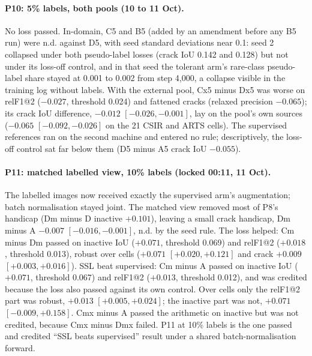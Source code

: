 \paragraph{P10: 5\% labels, both pools (10 to 11 Oct).} No loss passed. In-domain, C5 and B5 (added by an amendment before any B5
run) were n.d. against D5, with seed standard deviations near 0.1: seed 2 collapsed under both pseudo-label losses (crack IoU 0.142
and 0.128) but not under its loss-off control, and in that seed the tolerant arm's rare-class pseudo-label share stayed at 0.001 to 0.002 from step
4,000, a collapse visible in the training log without labels. With the external pool, Cx5 minus Dx5 was worse on relF1@2
($-0.027$, threshold 0.024) and fattened cracks (relaxed precision $-0.065$); its crack IoU difference, $-0.012$ $[-0.026, -0.001]$, lay
on the pool's own sources ($-0.065$ $[-0.092, -0.026]$ on the 21 CSIR and ARTS cells). The supervised references ran on the second
machine and entered no rule; descriptively, the loss-off control sat far below them (D5 minus A5 crack IoU $-0.055$).

\paragraph{P11: matched labelled view, 10\% labels (locked 00:11, 11 Oct).} The labelled images now received exactly the supervised
arm's augmentation; batch normalisation stayed joint. The matched view removed most of P8's handicap (Dm minus D inactive $+0.101$),
leaving a small crack handicap, Dm minus A $-0.007$ $[-0.016, -0.001]$, n.d. by the seed rule. The loss helped: Cm minus Dm passed on
inactive IoU ($+0.071$, threshold 0.069) and relF1@2 ($+0.018$, threshold 0.013), robust over cells ($+0.071$ $[+0.020, +0.121]$ and
crack $+0.009$ $[+0.003, +0.016]$). SSL beat supervised: Cm minus A passed on inactive IoU ($+0.071$, threshold 0.067) and relF1@2
($+0.013$, threshold 0.012), and was credited because the loss also passed against its own control. Over cells only the relF1@2 part
was robust, $+0.013$ $[+0.005, +0.024]$; the inactive part was not, $+0.071$ $[-0.009, +0.158]$. Cmx minus A passed the arithmetic on
inactive but was not credited, because Cmx minus Dmx failed. P11 at 10\% labels is the one passed and credited ``SSL beats
supervised'' result under a shared batch-normalisation forward.

